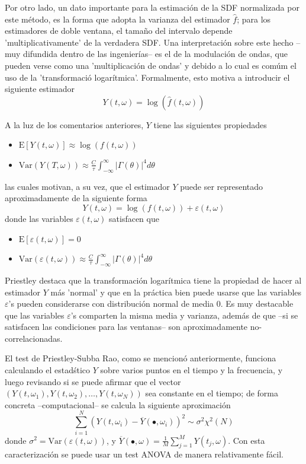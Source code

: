 \documentclass[12pt,a4paper]{mitthesis}
\newcommand{\intR}{\int_{-\infty}^{\infty}}
\newcommand{\est}[1]{\widehat{ #1 }}
\newcommand{\E}[1]{\mathrm{E}\left[ #1 \right]}
\newcommand{\Var}[1]{\mathrm{Var}\left( #1 \right)}
\newcommand{\abso}[1]{\left| #1 \right|}
\begin{document}
Por otro lado, un dato importante para la estimaci\'on de la SDF normalizada por este m\'etodo, es 
la forma que adopta la varianza del estimador $\widehat{f}$; para los estimadores de doble ventana, 
el tama\~no del intervalo depende 'multiplicativamente' de la verdadera SDF.
Una interpretaci\'on sobre este hecho --muy difundida dentro de las ingenier\'ias-- es el de la 
modulaci\'on de ondas, que pueden verse como una 'multiplicaci\'on de ondas' y debido a lo cual es 
com\'um el uso de la 'transformaci\'o logar\'itmica'.
Formalmente, esto motiva a introducir el siguiente estimador
\begin{equation*}
Y(t,\omega) = \log{\left( \est{f}(t,\omega)\right)}
\end{equation*}

A la luz de los comentarios anteriores, $Y$ tiene las siguientes propiedades
\begin{itemize}
\item $\displaystyle 
\E{ Y(t,\omega) } \approx \log \left( f(t,\omega) \right)$
\item $\displaystyle 
\Var{ Y(T,\omega) } 
\approx \frac{C}{\tau} \intR \abso{\Gamma (\theta)}^{4} d\theta $
\end{itemize}
las cuales motivan, a su vez, que el estimador $Y$ puede ser representado aproximadamente de la
siguiente forma
\begin{equation*}
Y(t,\omega) = \log \left( f(t,\omega) \right) + \varepsilon(t,\omega)
\end{equation*}
donde las variables $\varepsilon(t,\omega)$ satisfacen que
\begin{itemize}
\item $\displaystyle \E{\varepsilon(t,\omega)} = 0$
\item $\displaystyle \Var{\varepsilon(t,\omega)}
\approx \frac{C}{\tau} \intR \abso{\Gamma (\theta)}^{4} d\theta$
\end{itemize}

Priestley \cite{Priestley81} destaca que la transformaci\'on logar\'itmica tiene la propiedad de 
hacer al estimador $Y$ m\'as 'normal' y que en la pr\'actica bien puede usarse que las variables 
$\varepsilon$'s pueden considerarse con distribuci\'on normal de media 0.
Es muy destacable que las variables $\varepsilon$'s comparten la misma media y varianza, adem\'as 
de que --si se satisfacen las condiciones para las ventanas-- son aproximadamente 
no-correlacionadas.

El test de Priestley-Subba Rao, como se mencion\'o anteriormente, funciona calculando el 
estad\'stico $Y$ sobre varios puntos en el tiempo y la frecuencia, y luego revisando si se puede
afirmar que el vector  $\left( Y(t,\omega_1), Y(t,\omega_2), \dots, Y(t,\omega_N) \right)$ sea 
constante en el tiempo; de forma concreta --computacional-- se calcula la siguiente aproximaci\'on
\begin{equation*}
\sum_{i = 1 }^{N} \left( Y(t,\omega_i) - \overline{Y}(\bullet,\omega_i) \right)^{2} 
\sim \sigma^{2} \chi^{2}(N)
\end{equation*}
donde $\sigma^{2} = \Var{\varepsilon(t,\omega)}$, y
$\overline{Y}(\bullet,\omega) = \frac{1}{M} \sum_{j=1}^{M} Y(t_j,\omega)$.
Con esta caracterizaci\'on se puede usar un test ANOVA de manera relativamente f\'acil.
\end{document}
